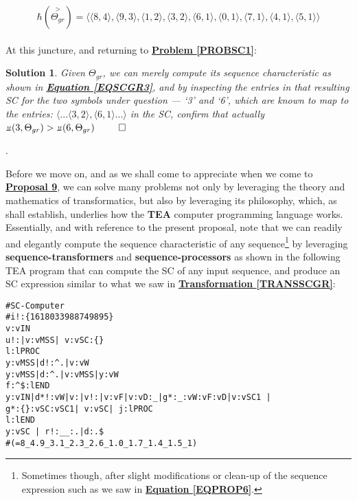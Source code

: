 \documentclass[12pt,a4paper]{article}
\newtheorem{soln}{Solution}
\newcommand{\invpi}[1]{\mathop{\rotatebox[origin=c]{180}{$\pi$}}#1}
\begin{document}
\begin{equation}
\label{EQSCGR3}
 \hbar(\overset{>}{\Theta_{gr}}) = \langle \langle 8, 4 \rangle, \langle 9, 3 \rangle, \langle 1, 2 \rangle, \langle 3, 2 \rangle, \langle 6, 1 \rangle, \langle 0, 1 \rangle, \langle 7, 1 \rangle, \langle 4, 1 \rangle, \langle 5, 1 \rangle \rangle 
\end{equation}\\


At this juncture, and returning to \textbf{\hyperref[PROBSC1]{Problem \ref{PROBSC1}}}:\\

\begin{soln}
Given $\Theta_{gr}$, we can merely compute its sequence characteristic as shown in \textbf{\hyperref[EQSCGR3]{Equation \ref{EQSCGR3}}}, and by inspecting the entries in that resulting SC for the two symbols under question --- `3' and `6', which are known to map to the entries: $\langle ... \langle 3, 2 \rangle, \langle 6, 1 \rangle ... \rangle$ in the SC, confirm that actually $\invpi(3,\Theta_{gr}) > \invpi(6,\Theta_{gr})$
$\qed$
\end{soln}.

Before we move on, and as we shall come to appreciate when we come to \textbf{\hyperref[PROP9]{Proposal 9}}, we can solve many problems not only by leveraging the theory and mathematics of transformatics, but also by leveraging its philosophy, which, as shall establish, underlies how the \textbf{TEA} computer programming language\cite{cli_tttt} works. Essentially, and with reference to the present proposal, note that we can readily and elegantly compute the sequence characteristic of any sequence\footnote{Sometimes though, after slight modifications or clean-up of the sequence expression such as we saw in \textbf{\hyperref[EQPROP6]{Equation \ref{EQPROP6}}}.} by leveraging \textbf{sequence-transformers} and \textbf{sequence-processors} as shown in the following TEA program that can compute the SC of any input sequence, and produce an SC expression similar to what we saw in \textbf{\hyperref[TRANSSCGR]{Transformation \ref{TRANSSCGR}}}:\\

 \small
  \begin{tcolorbox}[teaterminalstyle, title=TEA Program: SC-Transformer, breakable]
  \begin{lstlisting}[language=TEA,breaklines=true]
#SC-Computer
#i!:{1618033988749895} 
v:vIN
u!:|v:vMSS| v:vSC:{}
l:lPROC
y:vMSS|d!:^.|v:vW
y:vMSS|d:^.|v:vMSS|y:vW
f:^$:lEND
y:vIN|d*!:vW|v:|v!:|v:vF|v:vD:_|g*:_:vW:vF:vD|v:vSC1 |
g*:{}:vSC:vSC1| v:vSC| j:lPROC
l:lEND
y:vSC | r!:__:.|d:.$
#(=8_4.9_3.1_2.3_2.6_1.0_1.7_1.4_1.5_1)
   \end{lstlisting}
  \end{tcolorbox}
  \label{LISTSC}
  \vspace{1cm}
\end{document}
